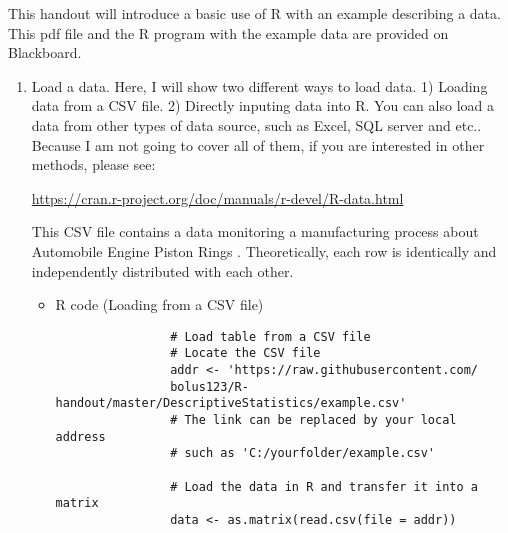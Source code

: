 This handout will introduce a basic use of R with an example describing a data. This pdf file and the R program with the example data are provided on Blackboard.
\begin{enumerate}
	\item Load a data. Here, I will show two different ways to load data. 1) Loading data from a CSV file. 2) Directly inputing data into R. You can also load a data from other types of data source, such as Excel, SQL server and etc.. Because I am not going to cover all of them, if you are interested in other methods, please see:
	\par \href{url}{https://cran.r-project.org/doc/manuals/r-devel/R-data.html} 
	\par This CSV file contains a data monitoring a manufacturing process about Automobile Engine Piston Rings \cite{Montgomery09}. Theoretically, each row is identically and independently distributed with each other.
		\begin{itemize}
			\item R code (Loading from a CSV file)
				\begin{verbatim}
				# Load table from a CSV file
				# Locate the CSV file
				addr <- 'https://raw.githubusercontent.com/
				bolus123/R-handout/master/DescriptiveStatistics/example.csv'
				# The link can be replaced by your local address 
				# such as 'C:/yourfolder/example.csv'
				
				# Load the data in R and transfer it into a matrix
				data <- as.matrix(read.csv(file = addr))
				

\end{verbatim}
\end{itemize}
\end{enumerate}

